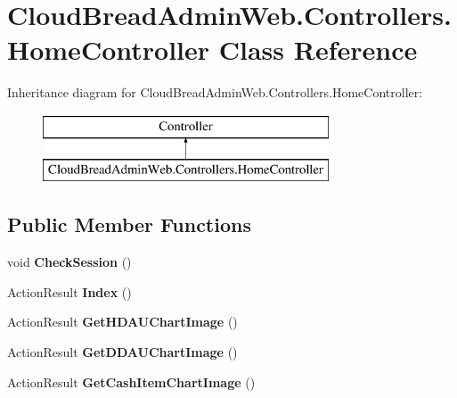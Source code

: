 \hypertarget{class_cloud_bread_admin_web_1_1_controllers_1_1_home_controller}{}\section{Cloud\+Bread\+Admin\+Web.\+Controllers.\+Home\+Controller Class Reference}
\label{class_cloud_bread_admin_web_1_1_controllers_1_1_home_controller}
Inheritance diagram for Cloud\+Bread\+Admin\+Web.\+Controllers.\+Home\+Controller\+:\begin{figure}[H]
\begin{center}
\leavevmode
\includegraphics[height=2.000000cm]{class_cloud_bread_admin_web_1_1_controllers_1_1_home_controller}
\end{center}
\end{figure}
\subsection*{Public Member Functions}
\begin{DoxyCompactItemize}
\item 
void {\bfseries Check\+Session} ()\hypertarget{class_cloud_bread_admin_web_1_1_controllers_1_1_home_controller_a4f9e86bf56470506217c3209adc2e59b}{}\label{class_cloud_bread_admin_web_1_1_controllers_1_1_home_controller_a4f9e86bf56470506217c3209adc2e59b}

\item 
Action\+Result {\bfseries Index} ()\hypertarget{class_cloud_bread_admin_web_1_1_controllers_1_1_home_controller_a69cce42d08d6af4d5ff5f9d46a8c0a60}{}\label{class_cloud_bread_admin_web_1_1_controllers_1_1_home_controller_a69cce42d08d6af4d5ff5f9d46a8c0a60}

\item 
Action\+Result {\bfseries Get\+H\+D\+A\+U\+Chart\+Image} ()\hypertarget{class_cloud_bread_admin_web_1_1_controllers_1_1_home_controller_a829e5f205a637734fd6a77fb4f7bd052}{}\label{class_cloud_bread_admin_web_1_1_controllers_1_1_home_controller_a829e5f205a637734fd6a77fb4f7bd052}

\item 
Action\+Result {\bfseries Get\+D\+D\+A\+U\+Chart\+Image} ()\hypertarget{class_cloud_bread_admin_web_1_1_controllers_1_1_home_controller_a111a81c40ef1fe28dca5eaf5ef0cab1f}{}\label{class_cloud_bread_admin_web_1_1_controllers_1_1_home_controller_a111a81c40ef1fe28dca5eaf5ef0cab1f}

\item 
Action\+Result {\bfseries Get\+Cash\+Item\+Chart\+Image} ()\hypertarget{class_cloud_bread_admin_web_1_1_controllers_1_1_home_controller_ae9f2de6d76e9bdd67b618e0a5dbc34a0}{}\label{class_cloud_bread_admin_web_1_1_controllers_1_1_home_controller_ae9f2de6d76e9bdd67b618e0a5dbc34a0}

\end{DoxyCompactItemize}
